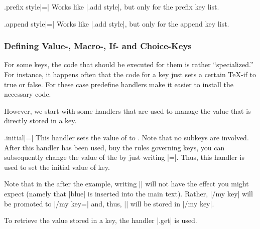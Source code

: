 \begin{handler}{{.prefix style}|=|}
  Works like |.add style|, but only for the prefix key list.
\end{handler}

\begin{handler}{{.append style}|=|}
  Works like |.add style|, but only for the append key list.
\end{handler}


\subsubsection{Defining Value-, Macro-, If- and Choice-Keys}

For some keys, the code that should be executed for them is rather
``specialized.'' For instance, it happens often that the code for a
key just sets a certain \TeX-if to true or false. For these case
predefine handlers make it easier to install the necessary code.

However, we start with some handlers that are used to manage the value
that is directly stored in a key.

\begin{handler}{{.initial}|=|}
  This handler sets the value of  to . Note that
  no subkeys are involved. After this handler has been used, buy the
  rules governing keys, you can subsequently change the value of the
   by just writing |=|. Thus, this
  handler is used to set the initial value of key.

\begin{codeexample}
\end{codeexample}

  Note that in the after the example, writing || will not
  have the effect you might expect (namely that |blue| is inserted
  into the main text). Rather, |/my key| will be promoted to
  |/my key=\pgfkeysnovalue| and, thus, |\pgfkeysnovalue| will be
  stored in |/my key|.

  To retrieve the value stored in a key, the handler |.get| is used.
\end{handler}


